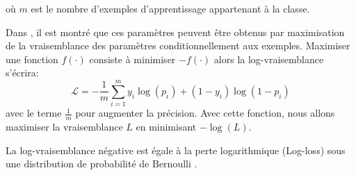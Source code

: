 	où $m$ est le nombre d'exemples d'apprentissage appartenant à la classe.
	
	Dans \cite{antoine2018apprentissage}, il est montré que ces paramètres peuvent être obtenus par maximisation de la vraisemblance des paramètres conditionnellement aux exemples. Maximiser une fonction $f(\cdot)$ consiste à minimiser $-f(\cdot)$ alors la log-vraisemblance s'écrira:
	\begin{equation}\label{eq:log-likelyhood}
		\mathcal{L} = -\frac{1}{m}\sum_{i=1}^{m} {y_i}\log( {p_i}) +{(1-y_i)}\log(1-p_i)
	\end{equation}
	avec le terme $\frac{1}{m}$ pour augmenter la précision. Avec cette fonction, nous allons maximiser la vraisemblance $L$ en minimisant $-\log(L)$.
	
	La log-vraisemblance négative est égale à la perte logarithmique (Log-loss) sous une distribution de probabilité de Bernoulli \cite{darlington2016regression, antoine2018apprentissage}.
	
	
	
	
	
	
	
	
